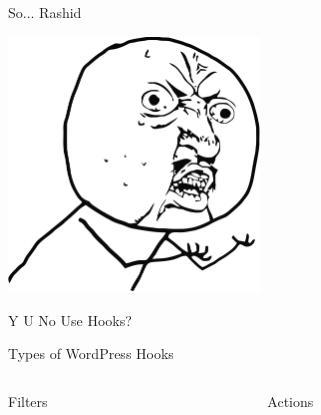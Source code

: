 \documentclass[10pt]{beamer}
\begin{document}
    \begin{frame}
        \begin{center}
            \begin{Huge}
                So... Rashid
            \end{Huge}

            \includegraphics[width=0.5\textwidth]{images/rashid}

            \begin{Huge}
                Y U No Use Hooks?
            \end{Huge}
        \end{center}
    \end{frame}

    \begin{frame}{Types of WordPress Hooks}
        \begin{columns}
            \begin{column}{0.5\textwidth}
                \begin{center}
                    \begin{Huge}
                        Filters
                    \end{Huge}
                \end{center}
            \end{column}
            \begin{column}{0.5\textwidth}
                \begin{center}
                    \begin{Huge}
                        Actions
                    \end{Huge}
                \end{center}
            \end{column}
        \end{columns}
    \end{frame}
\end{document}
